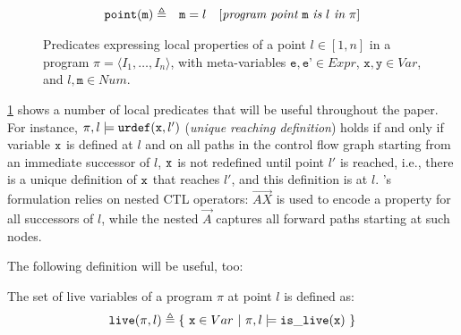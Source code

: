 \begin{figure}[hb]
\begin{small}
\begin{eqnarray*}
\text{${\tt point}$}(\texttt{m}) & \triangleq & \texttt{m}=l ~~~ [\textit{program point} ~ \text{${\tt m}$} ~ \textit{is} ~ l ~ \textit{in} ~ \pi]
\end{eqnarray*}
\vspace{-4mm}
\end{small}
\caption{\label{fig:osr-loc-pred}Predicates expressing local properties of a point $l\in [1,n]$ in a program $\pi=\langle I_1,\ldots,I_n\rangle$, with meta-variables $\texttt{e},\texttt{e'}\in Expr$, $\texttt{x}, \texttt{y}\in Var$, and $l, \texttt{m}\in Num$.}
\end{figure}

\myfigure\ref{fig:osr-loc-pred} shows a number of local predicates that will be useful throughout the paper. For instance, $\pi,l\models \text{${\tt urdef}$}(\text{${\tt x}$}, l')$ ({\em unique reaching definition}) holds if and only if variable $\text{${\tt x}$}$ is defined at $l$ and on all paths in the control flow graph starting from an immediate successor of $l$, $\text{${\tt x}$}$ is not redefined until point $l'$ is reached, i.e., there is a unique definition of $\text{${\tt x}$}$ that reaches $l'$, and this definition is at $l$. \ureachdef's formulation relies on nested CTL operators: $\overrightarrow{AX}$ is used to encode a property for all successors of $l$, while the nested $\overrightarrow{A}$ captures all forward paths starting at such nodes.

The following definition will be useful, too:

\begin{definition}
\label{de:live-var}
The set of live variables of a program $\pi$ at point $l$ is defined as:
\vspace{-1mm}
\begin{equation*}
\text{${\tt live}$}(\pi,l) \triangleq \{ ~ \text{${\tt x}$}\in Var ~ | ~ \pi, l\models \text{${\tt is\_live}$}(\text{${\tt x}$}) ~ \}
\end{equation*}
\end{definition}


